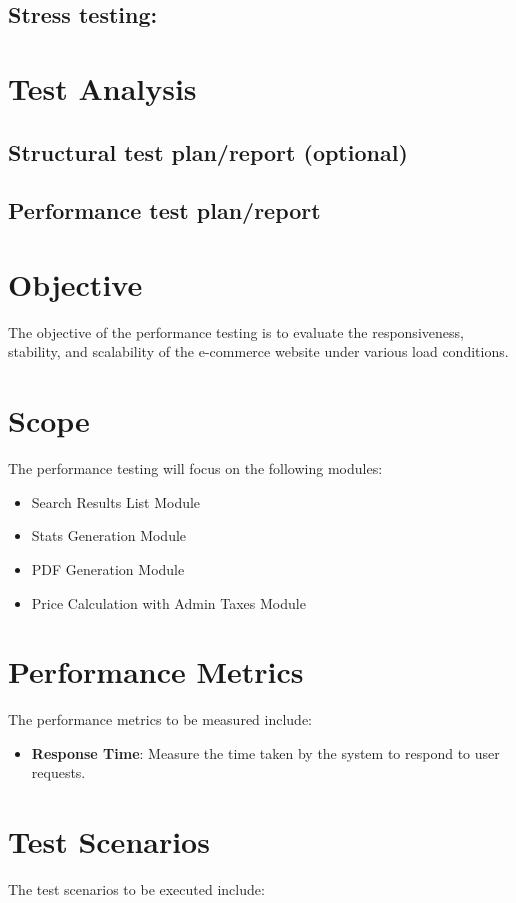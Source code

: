 \documentclass{article}
\begin{document}
\subsection{Stress testing:}
\section*{Test Analysis}


\subsection{Structural test plan/report (optional)}

\subsection{Performance test plan/report}
\section*{Objective}
The objective of the performance testing is to evaluate the responsiveness, stability, and scalability of the e-commerce website under various load conditions.

\section*{Scope}
The performance testing will focus on the following modules:
\begin{itemize}
  \item Search Results List Module
  \item Stats Generation Module
  \item PDF Generation Module
  \item Price Calculation with Admin Taxes Module
\end{itemize}

\section*{Performance Metrics}
The performance metrics to be measured include:

\begin{itemize}
  \item \textbf{Response Time}: Measure the time taken by the system to respond to user requests.
\end{itemize}

\section*{Test Scenarios}
The test scenarios to be executed include:
\end{document}
